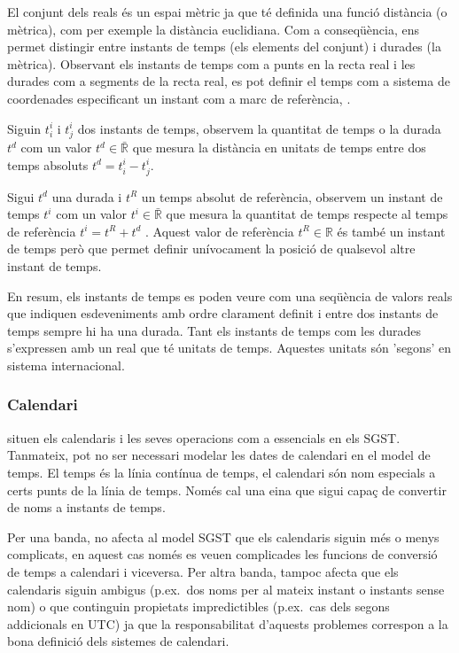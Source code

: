 El conjunt dels reals és un espai mètric ja que té definida una funció distància (o mètrica), com per exemple la distància euclidiana. Com a conseqüència, ens permet distingir entre instants de temps (els elements del conjunt) i durades (la mètrica). Observant els instants de temps com a punts en la recta real i les durades com a segments de la recta real, es pot definir el temps com a sistema de coordenades especificant un instant com a marc de referència, \parencite{iep:time-supplement,wiki:coordinate}. 


\begin{definition}[Temps]
  \label{def:model:temps}
  Siguin $t^i_i$ i $t^i_j$ dos instants de temps, observem la quantitat
  de temps o la durada $t^d$ com un valor $t^d \in\bar{\mathbb{R}}$
  que mesura la distància en unitats de temps entre dos temps
  absoluts $t^d = t^i_i - t^i_j$.
  
  Sigui $t^d$ una durada i $t^{R}$ un temps absolut de referència,
  observem un instant de temps $t^i$ com un valor $t^i
  \in\bar{\mathbb{R}}$ que mesura la quantitat de temps respecte al
  temps de referència $t^i= t^{R} + t^d$ . Aquest valor de referència
  $t^{R}\in\mathbb{R}$ és també un instant de temps però que permet
  definir unívocament la posició de qualsevol altre instant de temps.


\end{definition}

En resum, els instants de temps es poden veure com una seqüència de valors reals que indiquen esdeveniments amb ordre clarament definit i entre dos instants de temps sempre hi ha una durada. Tant els instants de temps com les durades s'expressen amb un real que té unitats de temps. Aquestes unitats són 'segons' en sistema internacional. 



\subsubsection{Calendari}
\textcite{dreyer94} situen els calendaris i les seves operacions com a essencials en els SGST. Tanmateix, pot no ser necessari modelar les dates de calendari en el model de temps. El temps és la línia contínua de temps, el calendari són nom especials a certs punts de la línia de temps. Només cal una eina que sigui capaç de convertir de noms a instants de temps. 

Per una banda, no afecta al model SGST que els calendaris siguin més o menys complicats, en aquest cas només es veuen complicades les funcions de conversió de temps a calendari i viceversa.
Per altra banda, tampoc afecta que els calendaris siguin ambigus (p.ex.\ dos noms per al mateix instant o instants sense nom) o que continguin propietats impredictibles (p.ex.\ cas dels segons addicionals en UTC) ja que la responsabilitat d'aquests problemes correspon a la bona definició dels sistemes de calendari.


